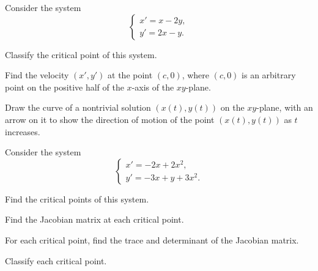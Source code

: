 \documentclass[11pt,oneside]{article}
\begin{document}
\begin{problem}
Consider the system
\[
\begin{cases}
x'=x-2y,\\
y'=2x-y.
\end{cases}
\]
\begin{problemsubparts}
\item Classify the critical point of this system.
\item Find the velocity $(x',y')$ at the point $(c,0)$, where $(c,0)$ is an arbitrary point on the positive half of the $x$-axis of the $xy$-plane.
\item Draw the curve of a nontrivial solution $(x(t),y(t))$ on the $xy$-plane, with an arrow on it to show the direction of motion of the point $(x(t),y(t))$ as $t$ increases.
\end{problemsubparts}
\end{problem}

\begin{problem}
Consider the system
\[
\begin{cases}
x'=-2x+2x^2,\\
y'=-3x+y+3x^2.
\end{cases}
\]
\begin{problemsubparts}
\item Find the critical points of this system.
\item Find the Jacobian matrix at each critical point.
\item For each critical point, find the trace and determinant of the Jacobian matrix.
\item Classify each critical point.
\end{problemsubparts}
\end{problem}
\end{document}
